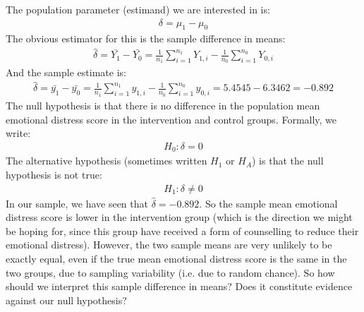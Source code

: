 \documentclass[letterpaper,10pt,english]{jupyterBook}
\begin{document}
\sphinxAtStartPar
{} The population parameter (estimand) we are interested in is:
\begin{equation*}
\begin{split}
\delta = \mu_1 - \mu_0
\end{split}
\end{equation*}
\sphinxAtStartPar
The obvious estimator for this is the sample difference in means:
\begin{equation*}
\begin{split}
\hat{\delta} = \bar{Y_1} - \bar{Y_0} = \frac{1}{n_1} \sum_{i=1}^{n_1} Y_{1,i} - \frac{1}{n_0} \sum_{i=1}^{n_0} Y_{0,i}
\end{split}
\end{equation*}
\sphinxAtStartPar
And the sample estimate is:
\begin{equation*}
\begin{split}
\hat{\delta} =  \bar{y_1} - \bar{y_0} = \frac{1}{n_1} \sum_{i=1}^{n_1} y_{1,i} - \frac{1}{n_0} \sum_{i=1}^{n_0} y_{0,i} = 5.4545 - 6.3462 = -0.892
\end{split}
\end{equation*}
\sphinxAtStartPar
{} The null hypothesis is that there is no difference in the population mean emotional distress score in the intervention and control groups. Formally, we write:
\begin{equation*}
\begin{split}
H_0:  \delta = 0
\end{split}
\end{equation*}
\sphinxAtStartPar
The alternative hypothesis (sometimes written \(H_1\) or \(H_A\)) is that the null hypothesis is not true:
\begin{equation*}
\begin{split}
H_1: \delta \neq 0
\end{split}
\end{equation*}
\sphinxAtStartPar
In our sample, we have seen that \(\hat{\delta} = -0.892\). So the sample mean emotional distress score is lower in the intervention group (which is the direction we might be hoping for, since this group have received a form of counselling to reduce their emotional distress). However, the two sample means are very unlikely to be exactly equal, even if the true mean emotional distress score is the same in the two groups, due to sampling variability (i.e. due to random chance). So how should we interpret this sample difference in means? Does it constitute evidence against our null hypothesis?
\end{document}
